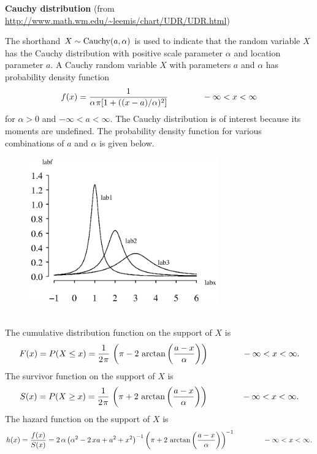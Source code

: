 \documentclass[12pt,fullpage]{article}
\begin{document}
\noindent
{\bf Cauchy distribution} (from \color{blue}\url{http://www.math.wm.edu/~leemis/chart/UDR/UDR.html}\color{black})

\noindent
The shorthand $X \sim {\rm Cauchy}(a,\alpha)$ is used to indicate that the
random variable $X$ has the Cauchy distribution with positive scale parameter $\alpha$ and location parameter $a$.
A Cauchy random variable $X$ with parameters $a$ and $\alpha$ has probability density function 
$$
f(x) = \frac{1} {\alpha \kern 0.08 em \pi [1 + ((x - a) / \alpha) ^ 2]} \qquad \qquad -\infty < x < \infty
$$
for $\alpha > 0$ and $-\infty < a < \infty$.
The Cauchy distribution is of interest because its moments are undefined.
The probability density function for various combinations of $a$ and $\alpha$ is given below. 
{\begin{figure}[h!]
\begin{center}
\includegraphics[width=3.2in]{CauchyPlot.ps}
\end{center}
\end{figure}}\\
The cumulative distribution function on
the support of $X$ is
$$
F(x) = P(X \le x) = \frac{1} {2 \kern 0.08 em \pi} \, \left( \pi - 2 \,\arctan \left( {\frac {a - x} {{\alpha}}} \right)  \right) \qquad \qquad -\infty < x < \infty.
$$
The survivor function on the support of $X$ is
$$
S(x) = P(X \ge x) = \frac{1} {2 \kern 0.08 em \pi} \, \left( \pi + 2 \,\arctan \left( {\frac {a - x} {{\alpha}}} \right)  \right) \qquad \qquad -\infty < x < \infty.
$$
The hazard function on the support of $X$ is
$$
h(x) = \frac{f(x)} {S(x)} = 2 \,\alpha  \left( {\alpha } ^ {2} - 2 \, x a + {a} ^ {2} + {x} ^ {2} \right) ^ {-1} \left( \pi + 2 \, \arctan \left( {\frac {a - x} {\alpha }} \right)  \right) ^ {\kern -0.08 em -1} \qquad \qquad -\infty < x < \infty.
$$
\end{document}
